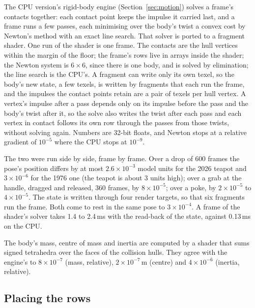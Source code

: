\documentclass[journal]{IEEEtran}
\begin{document}
The CPU version's rigid-body engine (Section~\ref{sec:motion}) solves a
frame's contacts together: each contact point keeps the impulse it
carried last, and a frame runs a few passes, each minimising over the
body's twist a convex cost by Newton's method with an exact line search.
That solver is ported to a fragment shader. One run of the shader is one
frame. The contacts are the hull vertices within the margin of the
floor; the frame's rows live in arrays inside the shader; the Newton
system is $6\times6$, since there is one body, and is solved by
elimination; the line search is the CPU's. A fragment can write only its
own texel, so the body's new state, a few texels, is written by
fragments that each run the frame, and the impulses the contact points
retain are a pair of texels per hull vertex. A vertex's impulse after a
pass depends only on its impulse before the pass and the body's twist
after it, so the solve also writes the twist after each pass and each
vertex in contact follows its own row through the passes from those
twists, without solving again. Numbers are 32-bit floats, and Newton
stops at a relative gradient of $10^{-5}$ where the CPU stops at
$10^{-9}$.

The two were run side by side, frame by frame. Over a drop of 600 frames
the pose's position differs by at most $2.6\times10^{-3}$ model units
for the 2026 teapot and $3\times10^{-6}$ for the 1976 one (the teapot is
about 3 units high); over a grab at the handle, dragged and released,
360 frames, by $8\times10^{-5}$; over a poke, by $2\times10^{-5}$ to
$4\times10^{-5}$. The state is written through four render targets, so
that six fragments run the frame. Both come to rest in the same pose to
$3\times10^{-4}$. A frame of the shader's solver takes 1.4 to 2.4\,ms
with the read-back of the state, against 0.13\,ms on the CPU. 

The body's mass, centre of mass and inertia are computed by a shader
that sums signed tetrahedra over the faces of the collision hulls. They
agree with the engine's to $8\times10^{-7}$ (mass, relative),
$2\times10^{-7}$\,m (centre) and $4\times10^{-6}$ (inertia, relative).

\subsection{Placing the rows}
\end{document}
